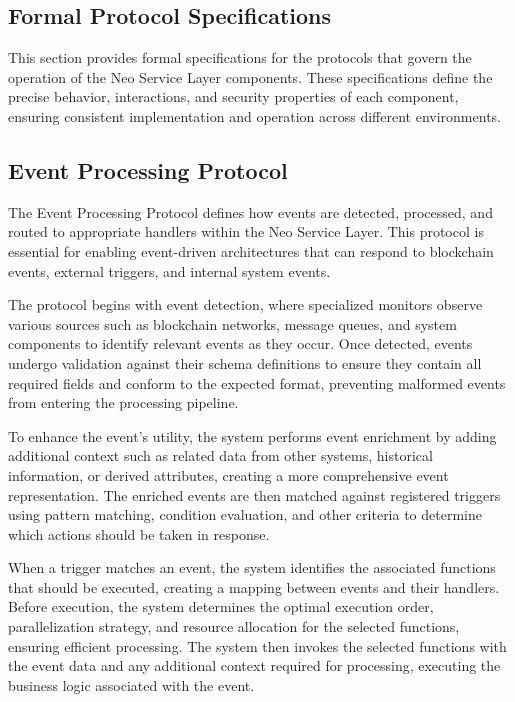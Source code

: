 \documentclass[12pt,a4paper]{article}
\begin{document}
\subsection{Formal Protocol Specifications}
\label{subsec:formal-protocols}

This section provides formal specifications for the protocols that govern the operation of the Neo Service Layer components. These specifications define the precise behavior, interactions, and security properties of each component, ensuring consistent implementation and operation across different environments.

\subsection{Event Processing Protocol}
\label{subsec:event-protocol-spec}

The Event Processing Protocol defines how events are detected, processed, and routed to appropriate handlers within the Neo Service Layer. This protocol is essential for enabling event-driven architectures that can respond to blockchain events, external triggers, and internal system events.



The protocol begins with event detection, where specialized monitors observe various sources such as blockchain networks, message queues, and system components to identify relevant events as they occur. Once detected, events undergo validation against their schema definitions to ensure they contain all required fields and conform to the expected format, preventing malformed events from entering the processing pipeline.

To enhance the event's utility, the system performs event enrichment by adding additional context such as related data from other systems, historical information, or derived attributes, creating a more comprehensive event representation. The enriched events are then matched against registered triggers using pattern matching, condition evaluation, and other criteria to determine which actions should be taken in response.

When a trigger matches an event, the system identifies the associated functions that should be executed, creating a mapping between events and their handlers. Before execution, the system determines the optimal execution order, parallelization strategy, and resource allocation for the selected functions, ensuring efficient processing. The system then invokes the selected functions with the event data and any additional context required for processing, executing the business logic associated with the event.
\end{document}
